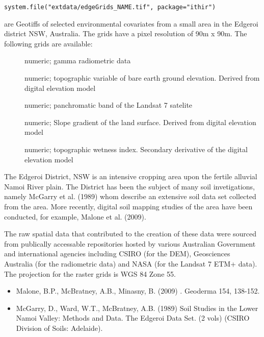 \documentclass[a4paper]{book}
\begin{document}
%
\begin{Usage}
\begin{verbatim}
system.file("extdata/edgeGrids_NAME.tif", package="ithir")
\end{verbatim}
\end{Usage}
%
\begin{Format}
 are Geotiffs of selected environmental covariates from a small area in the Edgeroi district NSW, Australia. The grids have a pixel resolution of 90m x 90m. The following grids are available:
\begin{description}

\item[] numeric; gamma radiometric data
\item[] numeric; topographic variable of bare earth ground elevation. Derived from digital elevation model
\item[] numeric; panchromatic band of the Landsat 7 satelite
\item[] numeric; Slope gradient of the land surface. Derived from digital elevation model  
\item[] numeric; topographic wetness index. Secondary derivative of the digital elevation model  

\end{description}

\end{Format}
%
\begin{Details}
The Edgeroi District, NSW is an intensive cropping area upon the fertile alluvial Namoi River plain. The District has been the subject of many soil invetigations, namely McGarry et al. (1989) whom describe an extensive soil data set collected from the area. More recently, digital soil mapping studies of the area have been conducted, for example, Malone et al. (2009).
\end{Details}
%
\begin{Note}
The raw spatial data that contributed to the creation of these data were sourced from publically accessable repositories hosted by various Australian Government and international agencies including CSIRO (for the DEM), Geosciences Australia (for the radiometric data) and NASA (for the Landsat 7 ETM+ data). The projection for the raster grids is WGS 84 Zone 55.
\end{Note}
%
\begin{References}
\begin{itemize}

\item{} Malone, B.P., McBratney, A.B., Minasny, B. (2009) . Geoderma 154, 138-152.
\item{} McGarry, D., Ward, W.T., McBratney, A.B. (1989) Soil Studies in the Lower Namoi Valley: Methods and Data. The Edgeroi Data Set. (2 vols) (CSIRO Division of Soils: Adelaide).

\end{itemize}

\end{References}
\end{document}

